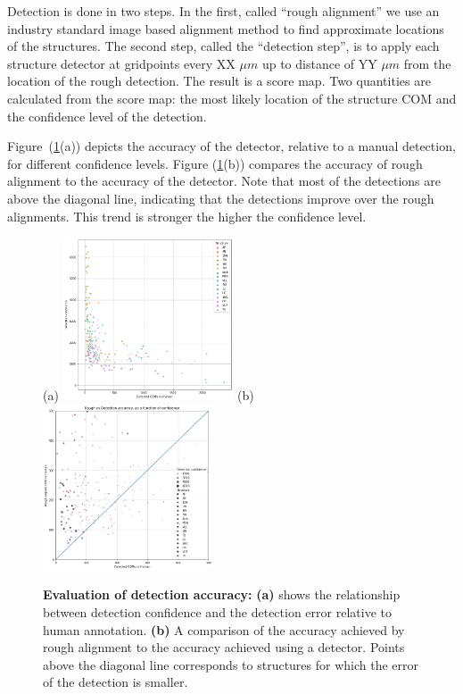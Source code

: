 \documentclass[11pt]{article}
\begin{document}
Detection is done in two steps. In the first, called ``rough
alignment'' we use an industry standard image based alignment method
to find approximate locations of the structures. The second step,
called the ``detection step'', is to apply each structure detector
at gridpoints every XX $\mu m$ up to distance of YY $\mu m $ from the
location of the rough detection. The result is a score map. Two
quantities are calculated from the score map: the most likely location
of the structure COM and the confidence level of the detection.

Figure~(\ref{fig:structureAccuracy}(a)) depicts the accuracy of the
detector, relative to a manual detection, for different confidence
levels. Figure (\ref{fig:structureAccuracy}(b)) compares the accuracy
of rough alignment to the accuracy of the detector. Note that most of
the detections are above the diagonal line, indicating that the
detections improve over the rough alignments. This trend is stronger
the higher the confidence level.

\begin{figure}[t]
  (a) \includegraphics[width=0.45\textwidth]{figures/ErrorVSconfidence.png}
  \hspace{1cm}
  (b)\includegraphics[width=0.45\textwidth]{figures/RoughVSdetection.png}
  \caption{\label{fig:structureAccuracy} {\bf Evaluation of detection
      accuracy:} {\bf (a)} shows the relationship between detection
    confidence and the detection error relative to human annotation.
    {\bf (b)} A comparison of the accuracy achieved by rough alignment
    to the accuracy achieved using a detector. Points above the
    diagonal line corresponds to structures for which the error of the
    detection is smaller.}
\end{figure}
\end{document}
